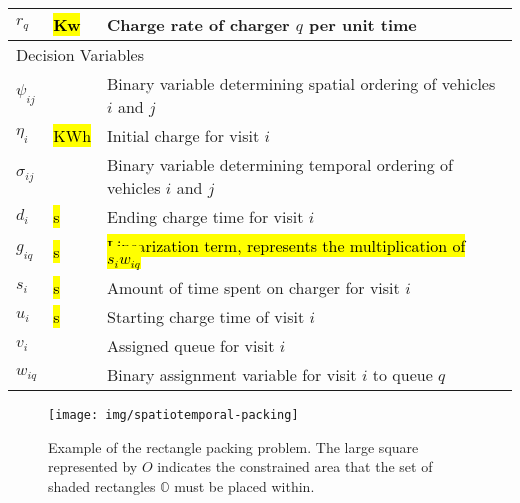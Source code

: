 \documentclass[utf8]{FrontiersinHarvard}
\begin{document}
\begin{table}[!htpb]
\begin{tabularx}{\textwidth}{l l l}
    $r_q$        & \hl{Kw} & Charge rate of charger $q$ per unit time                                                               \\
    \hline
    \multicolumn{3}{l}{Decision Variables}                                                                                          \\
    \hline
    $\psi_{ij}$     & & Binary variable determining spatial ordering of vehicles $i$ and $j$                                           \\
    $\eta_i$        & \hl{KWh} & Initial charge for visit $i$                                                                          \\
    $\sigma_{ij}$     & & Binary variable determining temporal ordering of vehicles $i$ and $j$                                          \\
    $d_i$        & \hl{s} & Ending charge time for visit $i$                                                                        \\
    $g_{iq}$     & \hl{s} & \hl{Linearization term, represents the multiplication of $s_i w_{iq}$}                                  \\
    $s_i$        & \hl{s} & Amount of time spent on charger for visit $i$                                                           \\
    $u_i$        & \hl{s} & Starting charge time of visit $i$                                                                       \\
    $v_i$        & & Assigned queue for visit $i$                                                                                   \\
    $w_{iq}$     & & Binary assignment variable for visit $i$ to queue $q$                                                          \\
   \bottomrule
  \end{tabularx}
\end{table}

\begin{figure}[htpb]
\centering
    \texttt{[image: img/spatiotemporal-packing]}
    \caption{Example of the rectangle packing problem. The large square represented by $O$ indicates the constrained
      area that the set of shaded rectangles $\mathbb{O}$ must be placed within.}
    \label{fig:packexample}
\end{figure}
\end{document}
